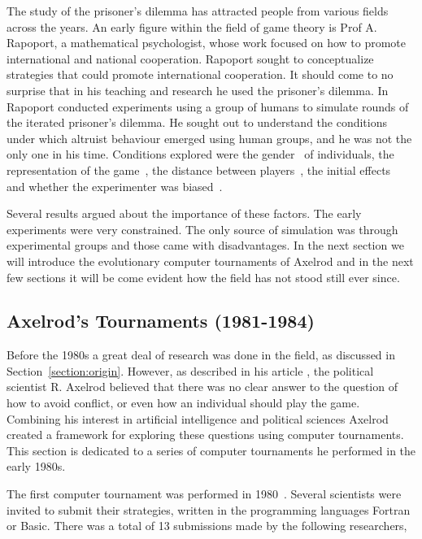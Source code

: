 \documentclass{article}
\theoremstyle{definition}
\begin{document}
The study of the prisoner's dilemma has attracted people from various fields
across the years. An early figure within the field of game theory
is Prof A. Rapoport, a mathematical psychologist, whose work focused on
how to promote international and national cooperation. Rapoport sought to conceptualize
strategies that could promote international cooperation. It should come to no surprise
that in his teaching and research he used the prisoner's dilemma.
In~\cite{rapoport1965} Rapoport conducted experiments using a group of humans
to simulate rounds of the iterated prisoner's dilemma. He sought out to understand
the conditions under which altruist behaviour emerged using human groups, and
he was not the only one in his time.
Conditions explored were the gender~\cite{Evans1966, Lutzker1961, Mack1971} of
individuals, the representation of the game~\cite{Evans1966}, the distance between
players~\cite{Sensenig1972}, the initial effects~\cite{Tedeschi1968} and whether
the experimenter was biased~\cite{Gallo1968}.

Several results argued about the importance of these factors. The early experiments
were very constrained. The only source of simulation was through experimental groups
and those came with disadvantages. In the next section we will introduce
the evolutionary computer tournaments of Axelrod and in the next few sections
it will be come evident how the field has not stood still ever since.

\subsection{Axelrod's Tournaments (1981-1984)}\label{subsection:axelrods_tournament}

Before the 1980s a great deal of research was done in the field, as discussed
in Section~\ref{section:origin}. However, as described in his article
\cite{Axelrod2012}, the political scientist R. Axelrod believed
that there was no clear answer to the question of how to avoid conflict, or even
how an individual should play the game. Combining his interest in artificial
intelligence and political sciences Axelrod created a framework for exploring these
questions using computer tournaments. This section is dedicated to a series of
computer tournaments he performed in the early 1980s.

The first computer tournament was performed in 1980~\cite{Axelrod1980a}.
Several scientists were invited to submit their strategies, written in the
programming languages Fortran or Basic. There was a total of 13 submissions
made by the following researchers,
\end{document}
